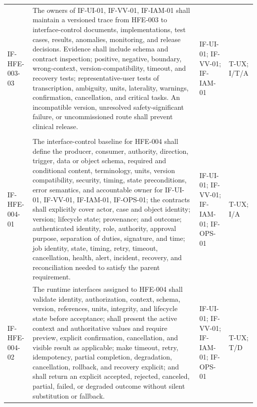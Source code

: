 \documentclass[11pt,letterpaper]{article}
\begin{document}
\begin{scriptsize}
\begin{longtable}{@{}L{0.14\textwidth}L{0.49\textwidth}L{0.19\textwidth}L{0.10\textwidth}@{}}
\mbox{IF-HFE-003-03} & The owners of IF-UI-01, IF-VV-01, IF-IAM-01 shall maintain a versioned trace from HFE-003 to interface-control documents, implementations, test cases, results, anomalies, monitoring, and release decisions. Evidence shall include schema and contract inspection; positive, negative, boundary, wrong-context, version-compatibility, timeout, and recovery tests; representative-user tests of transcription, ambiguity, units, laterality, warnings, confirmation, cancellation, and critical tasks. An incompatible version, unresolved safety-significant failure, or uncommissioned route shall prevent clinical release. & IF-UI-01; IF-VV-01; IF-IAM-01 & T-UX; I\slash\allowbreak{}T\slash\allowbreak{}A \\
\addlinespace[2pt]
 \\
\addlinespace[2pt]
\mbox{IF-HFE-004-01} & The interface-control baseline for HFE-004 shall define the producer, consumer, authority, direction, trigger, data or object schema, required and conditional content, terminology, units, version compatibility, security, timing, state preconditions, error semantics, and accountable owner for IF-UI-01, IF-VV-01, IF-IAM-01, IF-OPS-01; the contracts shall explicitly cover actor, case and object identity; version; lifecycle state; provenance; and outcome; authenticated identity, role, authority, approval purpose, separation of duties, signature, and time; job identity, state, timing, retry, timeout, cancellation, health, alert, incident, recovery, and reconciliation needed to satisfy the parent requirement. & IF-UI-01; IF-VV-01; IF-IAM-01; IF-OPS-01 & T-UX; I\slash\allowbreak{}A \\
\addlinespace[2pt]
\mbox{IF-HFE-004-02} & The runtime interfaces assigned to HFE-004 shall validate identity, authorization, context, schema, version, references, units, integrity, and lifecycle state before acceptance; shall present the active context and authoritative values and require preview, explicit confirmation, cancellation, and visible result as applicable; make timeout, retry, idempotency, partial completion, degradation, cancellation, rollback, and recovery explicit; and shall return an explicit accepted, rejected, canceled, partial, failed, or degraded outcome without silent substitution or fallback. & IF-UI-01; IF-VV-01; IF-IAM-01; IF-OPS-01 & T-UX; T\slash\allowbreak{}D \\

\end{longtable}
\end{scriptsize}
\end{document}
